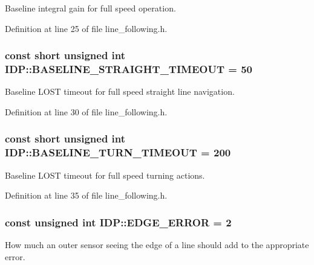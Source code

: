 Baseline integral gain for full speed operation. 



Definition at line 25 of file line\_\-following.h.

\hypertarget{namespaceIDP_ad49ae86fe58241291415f56ea64c8ac8}{
\subsubsection[{BASELINE\_\-STRAIGHT\_\-TIMEOUT}]{\setlength{\rightskip}{0pt plus 5cm}const short unsigned int {\bf IDP::BASELINE\_\-STRAIGHT\_\-TIMEOUT} = 50}}
\label{namespaceIDP_ad49ae86fe58241291415f56ea64c8ac8}


Baseline LOST timeout for full speed straight line navigation. 



Definition at line 30 of file line\_\-following.h.

\hypertarget{namespaceIDP_ad315440c84ff5573297a088ffafc1b92}{
\subsubsection[{BASELINE\_\-TURN\_\-TIMEOUT}]{\setlength{\rightskip}{0pt plus 5cm}const short unsigned int {\bf IDP::BASELINE\_\-TURN\_\-TIMEOUT} = 200}}
\label{namespaceIDP_ad315440c84ff5573297a088ffafc1b92}


Baseline LOST timeout for full speed turning actions. 



Definition at line 35 of file line\_\-following.h.

\hypertarget{namespaceIDP_afa01378acc238f4bd41d8eb304f7afd7}{
\subsubsection[{EDGE\_\-ERROR}]{\setlength{\rightskip}{0pt plus 5cm}const unsigned int {\bf IDP::EDGE\_\-ERROR} = 2}}
\label{namespaceIDP_afa01378acc238f4bd41d8eb304f7afd7}


How much an outer sensor seeing the edge of a line should add to the appropriate error. 



